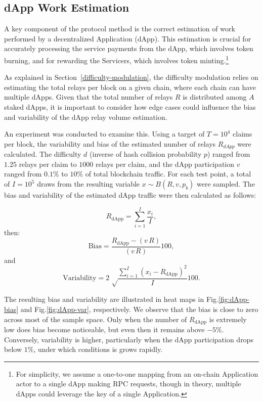 \documentclass[runningheads]{llncs}
\begin{document}
\subsection{dApp Work Estimation}

A key component of the protocol method is the correct estimation of work performed by a decentralized Application (dApp). This estimation is crucial for accurately processing the service payments from the dApp, which involves token burning, and for rewarding the Servicers, which involves token minting.\footnote{For simplicity, we assume a one-to-one mapping from an on-chain Application actor to a single dApp making RPC requests, though in theory, multiple dApps could leverage the key of a single Application.}

As explained in Section~\ref{difficulty-modulation}, the difficulty modulation relies on estimating the total relays per block on a given chain, where each chain can have multiple dApps. Given that the total number of relays $R$ is distributed among $A$ staked dApps, it is important to consider how edge cases could influence the bias and variability of the dApp relay volume estimation.

An experiment was conducted to examine this. Using a target of $T = 10^4$ claims per block, the variability and bias of the estimated number of relays $R_{dApp}$ were calculated. The difficulty $d$ (inverse of hash collision probability $p$) ranged from $1.25$ relays per claim to $1000$ relays per claim, and the dApp participation $v$ ranged from $0.1\%$ to $10\%$ of total blockchain traffic. For each test point, a total of $I=10^5$ draws from the resulting variable $x \sim B(R, v, p_b)$ were sampled. The bias and variability of the estimated dApp traffic were then calculated as follows:

\begin{equation}
    R_{\mbox{dApp}} = \sum_{i=1}^{I} \frac{x_i}{I},
\end{equation}
then:
\begin{equation}
    \label{equ:bias}
    \mbox{Bias} = \frac{R_{\mbox{dApp}} - (v\, R)}{(v\, R)} 100,
\end{equation}
and 
\begin{equation}
    \label{equ:var}
    \mbox{Variability} = 2 \, \sqrt\frac{\sum_{i=1}^{I}{(x_i-R_{\mbox{dApp}})^2}}{I} 100.
\end{equation}

The resulting bias and variability are illustrated in heat maps in Fig.\ref{fig:dApp-bias} and Fig.\ref{fig:dApp-var}, respectively. We observe that the bias is close to zero across most of the sample space. Only when the number of $R_{\mbox{dApp}}$ is extremely low does bias become noticeable, but even then it remains above $-5\%$. Conversely, variability is higher, particularly when the dApp participation drops below $1\%$, under which conditions is grows rapidly.
\end{document}
